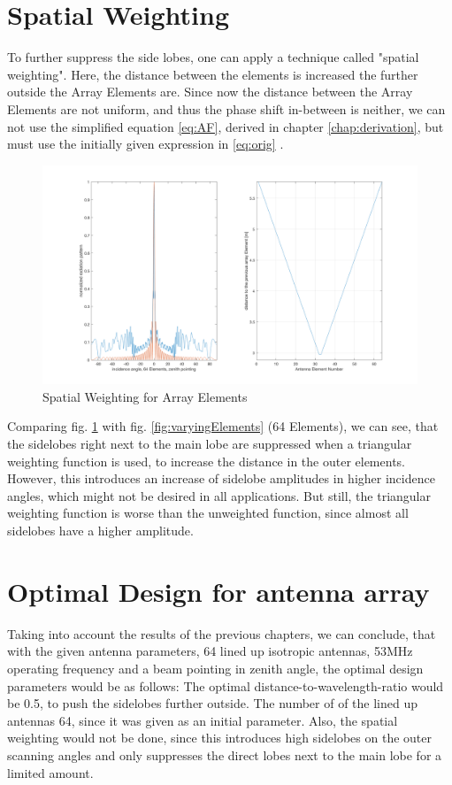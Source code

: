 \section{Spatial Weighting}
To further suppress the side lobes, one can apply a technique called "spatial weighting". Here, the distance between the elements is increased the further outside the Array Elements are.
Since now the distance between the Array Elements are not uniform, and thus the phase shift in-between is neither, we can not use the simplified equation \ref{eq:AF}, derived in chapter \ref{chap:derivation}, but must use the initially given expression in \ref{eq:orig} \citep{roettger1989instrumental}.

\begin{figure}[h!]
	\centering
	\includegraphics[width=\textwidth]{images/triangularSpatialWeight}
	\caption{Spatial Weighting for Array Elements}
	\label{fig:triangWeight}
\end{figure}

Comparing fig. \ref{fig:triangWeight} with fig. \ref{fig:varyingElements} (64 Elements), we can see, that the sidelobes right next to the main lobe are suppressed when a triangular weighting function is used, to increase the distance in the outer elements. However, this introduces an increase of sidelobe amplitudes in higher incidence angles, which might not be desired in all applications. But still, the triangular weighting function is worse than the unweighted function, since almost all sidelobes have a higher amplitude.



\section{Optimal Design for antenna array}
\label{chap:optimal}
Taking into account the results of the previous chapters, we can conclude, that with the given antenna parameters, 64 lined up isotropic antennas, 53MHz operating frequency and a beam pointing in zenith angle, the optimal design parameters would be as follows:
The optimal distance-to-wavelength-ratio would be 0.5, to push the sidelobes further outside.
The number of of the lined up antennas 64, since it was given as an initial parameter.
Also, the spatial weighting would not be done, since this introduces high sidelobes on the outer scanning angles and only suppresses the direct lobes next to the main lobe for a limited amount.

